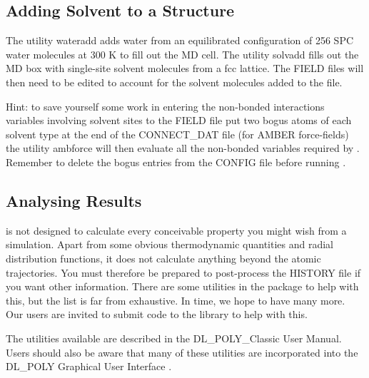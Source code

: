 \subsection{Adding Solvent to a Structure}

The utility {\sc wateradd} adds water from an equilibrated
configuration of 256 SPC water molecules at 300 K to fill out the
MD cell.  The utility {\sc solvadd} fills out the MD box with
single-site solvent molecules from a fcc lattice.  The FIELD files
will then need to be edited to account for the solvent molecules
added to the file.

Hint: to save yourself some work in entering the non-bonded
interactions variables involving solvent sites to the FIELD file put
two bogus atoms of each solvent type at the end of the CONNECT\_DAT
file (for AMBER force-fields) the
utility {\sc ambforce} will then evaluate all the
non-bonded variables required by \D.
Remember to delete the bogus entries from the CONFIG file before
running \D.

\subsection{Analysing Results}

\D is not designed to calculate every conceivable property you
might wish from a simulation.  Apart from some obvious
thermodynamic quantities and radial distribution functions, it
does not calculate anything beyond the atomic trajectories.  You
must therefore be prepared to post-process the HISTORY file if you
want other information.  There are some utilities in the \D
package to help with this, but the list is far from exhaustive. In
time, we hope to have many more.  Our users are invited to submit
code to the  library to help with this.

The utilities available are described in the DL\_POLY\_Classic User
Manual.  Users should also be aware that many of these utilities are
incorporated into the DL\_POLY Graphical User
Interface \cite{smith-gui}.
